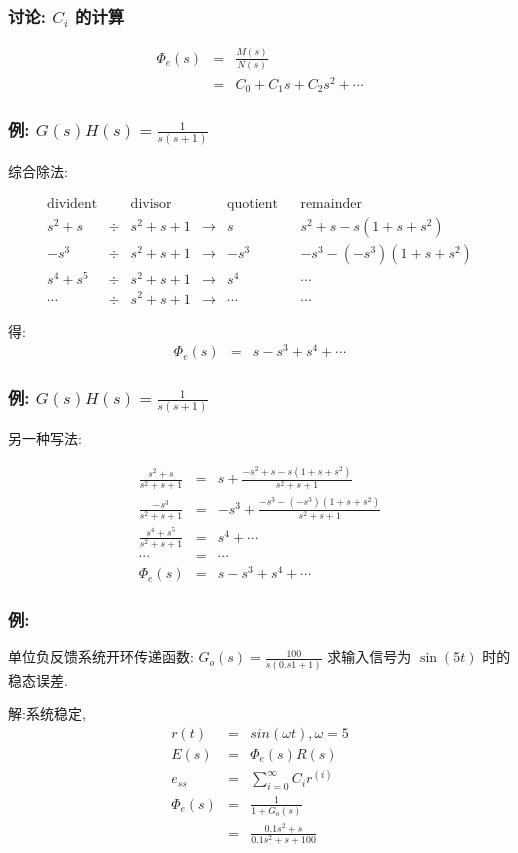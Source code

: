\documentclass{article}
\begin{document}
\begin{frame}
\frametitle{讨论: $C_i$ 的计算}
\label{sec-3-3-4}

\begin{eqnarray*}
\Phi_e(s) &=& \frac{M(s)}{N(s)} \\
 & = & C_0+C_1s+C_2s^2+\cdots
\end{eqnarray*}
\end{frame}
\begin{frame}
\frametitle{例: $G(s)H(s)=\frac{1}{s(s+1)}$}
\label{sec-3-3-5}


综合除法:

\[
\begin{matrix}
\text{divident}      &      &   \text{divisor}  &    & \text{quotient} &   & \text{remainder} \\  
s^2+s             &\div  &    s^2+s+1     & \rightarrow &  s       &  & s^2+s-s(1+s+s^2) \\
-s^3             &\div  &   s^2+s+1       & \rightarrow  & -s^3     &   & -s^3-(-s^3)(1+s+s^2)\\
 s^4+s^5         &\div  &  s^ 2+s+1       & \rightarrow & s^4  &   & \cdots  \\
\cdots           &\div   &  s^2+s+1       &\rightarrow  & \cdots   &    &\cdots   
\end{matrix}
\]

得:
\begin{eqnarray*}
\Phi_e(s)  &=& s-s^3+s^4+\cdots
\end{eqnarray*}
\end{frame}
\begin{frame}
\frametitle{例: $G(s)H(s)=\frac{1}{s(s+1)}$}
\label{sec-3-3-6}


另一种写法:

\begin{eqnarray*}
\frac{s^2+s}{s^2+s+1} & = & s + \frac{-s^2+s-s(1+s+s^2)}{s^2+s+1}  \\
\frac{-s^3}{s^2+s+1}  & = & -s^3+\frac{-s^3-(-s^3)(1+s+s^2)}{s^2+s+1}\\
\frac{s^4+s^5}{s^2+s+1} &=& s^4 +\cdots \\
\cdots                  &=& \cdots \\
\Phi_e(s)               &=& s-s^3+s^4+\cdots
\end{eqnarray*}
\end{frame}
\begin{frame}
\frametitle{例:}
\label{sec-3-3-7}

单位负反馈系统开环传递函数: $G_o(s)=\frac{100}{s(0.s1+1)}$ 求输入信号为 $\sin(5 t)$ 时的稳态误差.

解:系统稳定,
\begin{eqnarray*}
r(t) &=& sin(\omega t),\omega=5 \\
E(s) &=& \Phi_e(s)R(s) \\
e_{ss}&=& \sum_{i=0}^{\infty}C_i r^{(i)} \\
\Phi_e(s)&=& \frac{1}{1+G_o(s)} \\
         &=& \frac{0.1s^2+s}{0.1s^2+s+100} 
\end{eqnarray*}
\end{frame}
\end{document}
